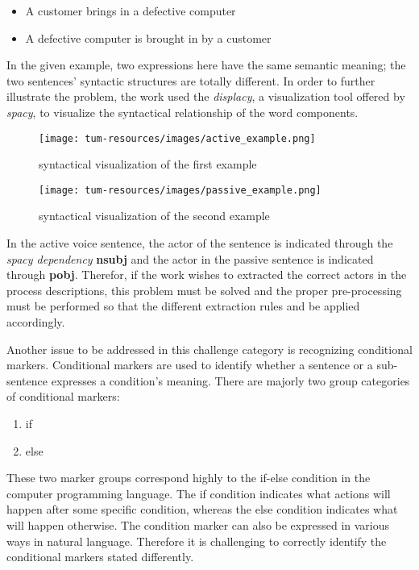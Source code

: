 \begin{itemize}
	\item A customer brings in a defective computer
	\item A defective computer is brought in by a customer
\end{itemize}


In the given example, two expressions here have the same semantic meaning; the two sentences' syntactic structures are totally different. In order to further illustrate the problem, the work used the \textit{displacy}, a visualization tool offered by \textit{spacy}, to visualize the syntactical relationship of the word components.

\begin{figure}[h]
    \centering
    \caption{syntactical visualization of the first example}
    \texttt{[image: tum-resources/images/active\_example.png]}
\end{figure}
\begin{figure}[h]
    \centering
    \caption{syntactical visualization of the second example}
    \texttt{[image: tum-resources/images/passive\_example.png]}
\end{figure}
In the active voice sentence, the actor of the sentence is indicated through the \textit{spacy dependency} \textbf{nsubj} and the actor in the passive sentence is indicated through \textbf{pobj}. Therefor, if the work wishes to extracted the correct actors in the process descriptions, this problem must be solved and the proper pre-processing must be performed so that the different extraction rules and be applied accordingly.  

Another issue to be addressed in this challenge category is recognizing conditional markers. Conditional markers are used to identify whether a sentence or a sub-sentence expresses a condition's meaning. There are majorly two group categories of conditional markers: 

\begin{enumerate}
	\item if
	\item else
\end{enumerate}

These two marker groups correspond highly to the if-else condition in the computer programming language. The if condition indicates what actions will happen after some specific condition, whereas the else condition indicates what will happen otherwise. The condition marker can also be expressed in various ways in natural language. Therefore it is challenging to correctly identify the conditional markers stated differently. 

